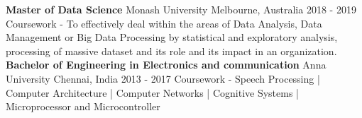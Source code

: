 

\begin{cventries}

  \cventry
    {\textbf{Master of Data Science}} %
    {Monash University} %
    {Melbourne, Australia} %
    {2018 - 2019} %
    {\normalsize{Coursework - To effectively deal within the areas of Data Analysis, Data Management or Big Data Processing by statistical and exploratory analysis, processing of massive dataset and its role and its impact in an organization.}}
\vspace{0.3cm}
  \cventry
    {\textbf{Bachelor of Engineering in Electronics and communication}} %
    {Anna University} %
    {Chennai, India} %
    {2013 - 2017} %
    {\normalsize{Coursework - Speech Processing | Computer Architecture | Computer Networks | Cognitive Systems | Microprocessor and Microcontroller }}
\vspace{-0.25cm}
\end{cventries}
